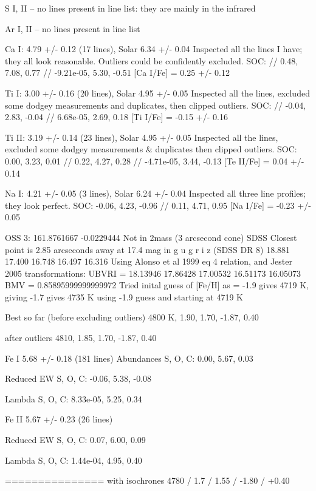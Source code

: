 \documentclass{emulateapj}
\begin{document}
S I, II -- no lines present in line list: they are mainly in the infrared

Ar I, II -- no lines present in line list

Ca I: 4.79 +/- 0.12 (17 lines), Solar 6.34 +/- 0.04
Inspected all the lines I have; they all look reasonable. Outliers could be confidently excluded.
SOC: // 0.48, 7.08, 0.77 // -9.21e-05, 5.30, -0.51
[Ca I/Fe] = 0.25 +/- 0.12

Ti I: 3.00 +/- 0.16 (20 lines), Solar 4.95 +/- 0.05
Inspected all the lines, excluded some dodgey measurements and duplicates, then clipped outliers.
SOC: // -0.04, 2.83, -0.04 // 6.68e-05, 2.69, 0.18
[Ti I/Fe] = -0.15 +/- 0.16

Ti II: 3.19 +/- 0.14 (23 lines), Solar 4.95 +/- 0.05
Inspected all the lines, excluded some dodgey measurements & duplicates then clipped outliers.
SOC: 0.00, 3.23, 0.01 // 0.22, 4.27, 0.28 // -4.71e-05, 3.44, -0.13
[Te II/Fe] = 0.04 +/- 0.14

Na I: 4.21 +/- 0.05 (3 lines), Solar 6.24 +/- 0.04
Inspected all three line profiles; they look perfect.
SOC: -0.06, 4.23, -0.96 // 0.11, 4.71, 0.95
[Na I/Fe] = -0.23 +/- 0.05



OSS 3: 161.8761667 -0.0229444
Not in 2mass (3 arcsecond cone)
SDSS  Closest point is 2.85 arcseconds away at 17.4 mag in g
u g r i z (SDSS DR 8)
18.881 17.400 16.748 16.497 16.316
Using Alonso et al 1999 eq 4 relation, and Jester 2005 transformations:
UBVRI = 18.13946 17.86428 17.00532 16.51173 16.05073
BMV = 0.85895999999999972
Tried inital guess of [Fe/H] as = -1.9 gives 4719 K, giving -1.7 gives 4735 K
using -1.9 guess and starting at 4719 K




Best so far (before excluding outliers)
4800 K, 1.90, 1.70, -1.87, 0.40

after outliers
4810, 1.85, 1.70, -1.87, 0.40

Fe I 5.68 +/- 0.18 (181 lines)
Abundances
S, O, C: 0.00, 5.67, 0.03

Reduced EW
S, O, C: -0.06, 5.38, -0.08

Lambda S, O, C: 8.33e-05, 5.25, 0.34

Fe II 5.67 +/- 0.23 (26 lines)

Reduced EW S, O, C: 0.07, 6.00, 0.09

Lambda S, O, C: 1.44e-04, 4.95, 0.40


===============
with isochrones
4780 / 1.7 / 1.55 / -1.80 / +0.40
\end{document}

